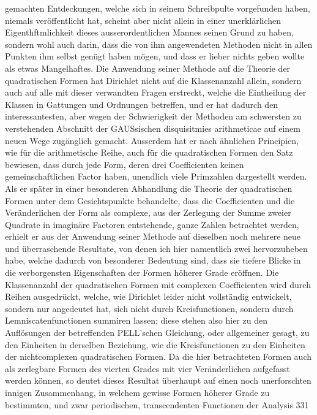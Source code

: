 \documentclass[11pt]{article}
\begin{document}
\noindent gemachten Entdeckungen, welche sich in seinem Schreibpulte vorgefunden haben, niemals veröffentlicht hat, scheint aber nicht allein in einer unerklärlichen Eigenthftmlichkeit dieses ausserordentlichen Mannes seinen Grund zu haben, sondern wohl auch darin, dass die von ihm angewendeten Methoden nicht in allen Punkten ihm selbst genügt haben mögen, und dass er lieber nichts geben wollte als etwas Mangelhaftes. Die Anwendung seiner Methode auf die Theorie der quadratischen Formen hat Dirichlet nicht auf die Klassenanzahl allein, sondern auch auf alle mit dieser verwandten Fragen erstreckt, welche die Eintheilung der Klassen in Gattungen und Ordnungen betreffen, und er hat dadurch den interessantesten, aber wegen der Schwierigkeit der Methoden am schwersten zu verstehenden Abschnitt der GAUSsischen disquisitmies arithmeticae auf einem neuen Wege zugänglich gemacht. Ausserdem hat er nach ähnlichen Principien, wie für die arithmetische Reihe, auch für die quadratischen Formen den Satz bewiesen, dass durch jede Form, deren drei Coefficienten keinen gemeinschaftlichen Factor haben, unendlich viele Primzahlen dargestellt werden. Als er später in einer besonderen Abhandlung die Theorie der quadratischen Formen unter dem Gesichtspunkte behandelte, dass die Coefficienten und die Veränderlichen der Form als complexe, aus der Zerlegung der Summe zweier Quadrate in imaginäre Factoren entstehende, ganze Zahlen betrachtet werden, erhielt er aus der Anwendung seiner Methode auf dieselben noch mehrere neue und überraschende Resultate, von denen ich hier namentlich zwei hervorzuheben habe, welche dadurch von besonderer Bedeutung sind, dass sie tiefere Blicke in die verborgensten Eigenschaften der Formen höherer Grade eröffnen. Die Klassenanzahl der quadratischen Formen mit complexen Coefficienten wird durch Reihen ausgedrückt, welche, wie Dirichlet leider nicht vollständig entwickelt, sondern nur angedeutet hat, sich nicht durch Kreisfunctionen, sondern durch Lemniscatenfunctionen summiren lassen; diese stehen also hier zu den Auflösungen der betreffenden PELL’schen Gleichung, oder allgemeiner gesagt, zu den Einheiten in derselben Beziehung, wie die Kreisfunctionen zu den Einheiten der nichtcomplexen quadratischen Formen. Da die hier betrachteten Formen auch als zerlegbare Formen des vierten Grades mit vier Veränderlichen aufgefasst werden können, so deutet dieses Resultat überhaupt auf einen noch unerforschten innigen Zusammenhang, in welchem gewisse Formen höherer Grade zu bestimmten, und zwar periodischen, transcendenten Functionen der Analysis  331
\par
\end{document}
